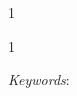\documentclass[12pt]{article}
\newcommand{\blind}{1}
\begin{document}
\doublespacing



\blind
{
\title{
    \Large
    \bf
    \georddtitle
}
\author{\georddauthor}
\maketitle
} \fi

\blind
{
  \bigskip
  \bigskip
  \bigskip
  \begin{center}
    {\LARGE\bf \georddtitle}
\end{center}
  \medskip
} \fi
\begin{abstract}
    
\end{abstract}

\noindent%
{\it Keywords}: \georddkeywords
\vfill
\newpage


\end{document}
